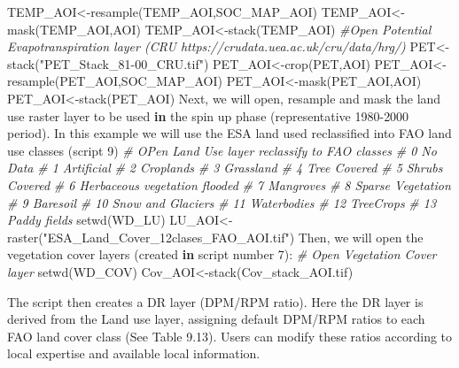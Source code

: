 \documentclass[
  10pt,
  b5paper,
]{book}
\newenvironment{Shaded}{\begin{snugshade}}{\end{snugshade}}
\newcommand{\CommentTok}[1]{\textcolor[rgb]{0.56,0.35,0.01}{\textit{#1}}}
\newcommand{\ControlFlowTok}[1]{\textcolor[rgb]{0.13,0.29,0.53}{\textbf{#1}}}
\newcommand{\DecValTok}[1]{\textcolor[rgb]{0.00,0.00,0.81}{#1}}
\newcommand{\FunctionTok}[1]{\textcolor[rgb]{0.00,0.00,0.00}{#1}}
\newcommand{\NormalTok}[1]{#1}
\newcommand{\OtherTok}[1]{\textcolor[rgb]{0.56,0.35,0.01}{#1}}
\newcommand{\SpecialCharTok}[1]{\textcolor[rgb]{0.00,0.00,0.00}{#1}}
\newcommand{\StringTok}[1]{\textcolor[rgb]{0.31,0.60,0.02}{#1}}
\begin{document}
\begin{Shaded}
\begin{Highlighting}[]
\NormalTok{TEMP\_AOI}\OtherTok{\textless{}{-}}\FunctionTok{resample}\NormalTok{(TEMP\_AOI,SOC\_MAP\_AOI)}
\NormalTok{TEMP\_AOI}\OtherTok{\textless{}{-}}\FunctionTok{mask}\NormalTok{(TEMP\_AOI,AOI)}
\NormalTok{TEMP\_AOI}\OtherTok{\textless{}{-}}\FunctionTok{stack}\NormalTok{(TEMP\_AOI)}
\CommentTok{\#Open Potential Evapotranspiration layer (CRU https://crudata.uea.ac.uk/cru/data/hrg/)}
\NormalTok{PET}\OtherTok{\textless{}{-}}\FunctionTok{stack}\NormalTok{(}\StringTok{"PET\_Stack\_81{-}00\_CRU.tif"}\NormalTok{)}
\NormalTok{PET\_AOI}\OtherTok{\textless{}{-}}\FunctionTok{crop}\NormalTok{(PET,AOI)}
\NormalTok{PET\_AOI}\OtherTok{\textless{}{-}}\FunctionTok{resample}\NormalTok{(PET\_AOI,SOC\_MAP\_AOI)}
\NormalTok{PET\_AOI}\OtherTok{\textless{}{-}}\FunctionTok{mask}\NormalTok{(PET\_AOI,AOI)}
\NormalTok{PET\_AOI}\OtherTok{\textless{}{-}}\FunctionTok{stack}\NormalTok{(PET\_AOI)}
\NormalTok{Next, we will open, resample and mask the land use raster layer to be used }\ControlFlowTok{in}\NormalTok{ the spin up }\FunctionTok{phase}\NormalTok{ (representative }\DecValTok{1980{-}2000}\NormalTok{ period).  In this example we will use the ESA land used reclassified into FAO land use }\FunctionTok{classes}\NormalTok{ (script }\DecValTok{9}\NormalTok{)}
\CommentTok{\# OPen Land Use layer reclassify to FAO classes }
\CommentTok{\# 0 No Data}
\CommentTok{\# 1 Artificial}
\CommentTok{\# 2 Croplands}
\CommentTok{\# 3 Grassland}
\CommentTok{\# 4 Tree Covered}
\CommentTok{\# 5 Shrubs Covered}
\CommentTok{\# 6 Herbaceous vegetation flooded}
\CommentTok{\# 7 Mangroves}
\CommentTok{\# 8 Sparse Vegetation}
\CommentTok{\# 9 Baresoil}
\CommentTok{\# 10 Snow and Glaciers}
\CommentTok{\# 11 Waterbodies}
\CommentTok{\# 12 TreeCrops}
\CommentTok{\# 13 Paddy fields}
\FunctionTok{setwd}\NormalTok{(WD\_LU)}
\NormalTok{LU\_AOI}\OtherTok{\textless{}{-}}\FunctionTok{raster}\NormalTok{(}\StringTok{"ESA\_Land\_Cover\_12clases\_FAO\_AOI.tif"}\NormalTok{)}
\NormalTok{Then, we will open the vegetation cover }\FunctionTok{layers}\NormalTok{ (created }\ControlFlowTok{in}\NormalTok{ script number }\DecValTok{7}\NormalTok{)}\SpecialCharTok{:}
\CommentTok{\# Open Vegetation Cover layer }
\FunctionTok{setwd}\NormalTok{(WD\_COV)}
\NormalTok{Cov\_AOI}\OtherTok{\textless{}{-}}\FunctionTok{stack}\NormalTok{(}\StringTok{\textquotesingle{}Cov\_stack\_AOI.tif\textquotesingle{}}\NormalTok{)}
\end{Highlighting}
\end{Shaded}

The script then creates a DR layer (DPM/RPM ratio). Here the DR layer is derived from the Land use layer, assigning default DPM/RPM ratios to each FAO land cover class (See Table 9.13). Users can modify these ratios according to local expertise and available local information.
\end{document}
